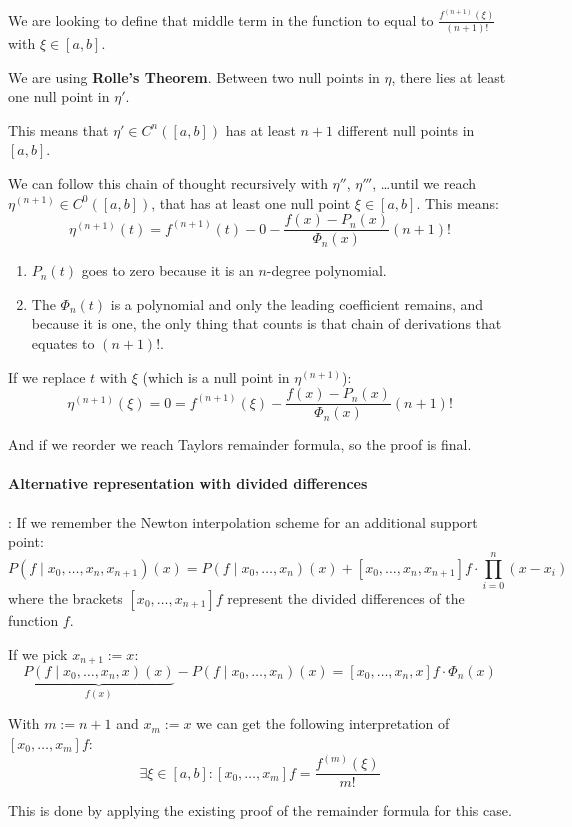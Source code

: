 \documentclass{article}
\begin{document}
We are looking to define that middle term in the function to equal to $\frac{f^{(n+1)}(\xi)}{(n+1)!}$ with $\xi \in [a,b]$.

We are using \textbf{Rolle's Theorem}. Between two null points in $\eta$, there lies at least one null point in $\eta'$.

This means that $\eta'\in C^n([a,b])$ has at least $n+1$ different null points in $[a,b]$.

We can follow this chain of thought recursively with $\eta''$, $\eta'''$, \dots until we reach $\eta^{(n+1)}\in C^0([a,b])$, that has at least one null point $\xi \in [a,b]$. This means:
\[\eta^{(n+1)}(t) = f^{(n+1)}(t) - 0 - \frac{f(x) - P_n(x)}{\Phi_n(x)}(n+1)!\]
\begin{enumerate}
  \item $P_n(t)$ goes to zero because it is an $n$-degree polynomial.
  \item The $\Phi_n(t)$ is a polynomial and only the leading coefficient remains, and because it is one, the only thing that counts is that chain of derivations that equates to $(n+1)!$.
\end{enumerate}

If we replace $t$ with $\xi$ (which is a null point in $\eta^{(n+1)}$):
\[\eta^{(n+1)}(\xi) = 0 = f^{(n+1)}(\xi) - \frac{f(x) - P_n(x)}{\Phi_n(x)}(n+1)!\]

And if we reorder we reach Taylors remainder formula, so the proof is final.

\paragraph{Alternative representation with divided differences}: If we remember the Newton interpolation scheme for an additional support point:
\[P(f \mid x_0,\dots,x_n,x_{n+1})(x) = P(f \mid x_0,\dots,x_n)(x) + [x_0,\dots,x_n,x_{n+1}]f \cdot \prod_{i=0}^n(x-x_i)\]
where the brackets $[x_0,\dots,x_{n+1}]f$ represent the divided differences of the function $f$.

If we pick $x_{n+1} := x$:
\[\underbrace{P(f \mid x_0,\dots,x_n,x)(x)}_{f(x)} - P(f \mid x_0,\dots,x_n)(x) = [x_0,\dots,x_n,x]f \cdot \Phi_n(x)\]

With $m:= n+1$ and $x_m := x$ we can get the following interpretation of $[x_0,\dots,x_m]f$:
\[\exists\xi \in [a,b]: [x_0,\dots,x_m]f = \frac{f^{(m)}(\xi)}{m!}\]

This is done by applying the existing proof of the remainder formula for this case.
\end{document}
